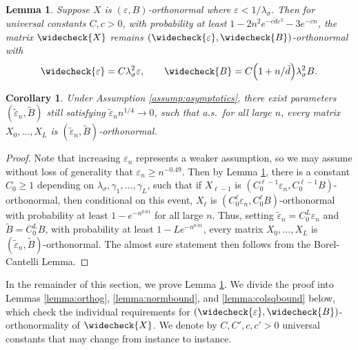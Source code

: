 \documentclass{article}
\newtheorem{lemma}[theorem]{Lemma}
\newtheorem{corollary}[theorem]{Corollary}
\theoremstyle{definition}
\newcommand{\eps}{\varepsilon}
\newcommand{\veps}{\widecheck{\varepsilon}}
\newcommand{\vd}{\check{d}}
\newcommand{\vB}{\widecheck{B}}
\newcommand{\vX}{\widecheck{X}}
\newcommand{\1}{\mathbf{1}}
\begin{document}
\begin{lemma}\label{lemma:orthonormalpropagation}
Suppose $X$ is $(\eps,B)$-orthonormal where $\eps<1/\lambda_\sigma$.
Then for universal
constants $C,c>0$, with probability at least $1-2n^2e^{-c\vd
\eps^2}-3e^{-cn}$, the matrix
$\vX$ remains $(\veps,\vB)$-orthonormal with
\[\veps=C\lambda_\sigma^2\eps,
\qquad \vB=C\Big(1+n/\vd\Big)\lambda_\sigma^2 B.\]
\end{lemma}

\begin{corollary}\label{cor:orthonormalinduction}
Under Assumption \ref{assump:asymptotics}, there exist
parameters $(\tilde{\eps}_n,\tilde{B})$ still satisfying
$\tilde{\eps}_n n^{1/4} \to 0$, such that a.s.\ for all large $n$,
every matrix $X_0,\ldots,X_L$ is $(\tilde{\eps}_n,\tilde{B})$-orthonormal.
\end{corollary}
\begin{proof}
Note that increasing $\eps_n$ represents a weaker assumption, so we may assume
without loss of generality that $\eps_n \geq n^{-0.49}$. Then
by Lemma \ref{lemma:orthonormalpropagation}, there is a constant $C_0 \geq 1$
depending on $\lambda_\sigma,\gamma_1,\ldots,\gamma_L$,
such that if $X_{\ell-1}$ is $(C_0^{\ell-1}\eps_n,C_0^{\ell-1}B)$-orthonormal,
then conditional on this event,
$X_\ell$ is $(C_0^\ell \eps_n,C_0^\ell B)$-orthonormal with probability
at least $1-e^{-n^{0.01}}$ for all large $n$. Thus, setting
$\tilde{\eps}_n=C_0^L\eps_n$ and $\tilde{B}=C_0^LB$,
with probability at least $1-Le^{-n^{0.01}}$, every matrix
$X_0,\ldots,X_L$ is $(\tilde{\eps}_n,\tilde{B})$-orthonormal.
The almost sure statement then follows from the Borel-Cantelli Lemma.
\end{proof}

In the remainder of this section, we prove
Lemma \ref{lemma:orthonormalpropagation}.
We divide the proof into Lemmas \ref{lemma:orthog},
\ref{lemma:normbound}, and \ref{lemma:colsqbound} below, which check the
individual requirements for $(\veps,\vB)$-orthonormality of $\vX$. We denote by
$C,C',c,c'>0$ universal constants that may change from instance to instance.
\end{document}
